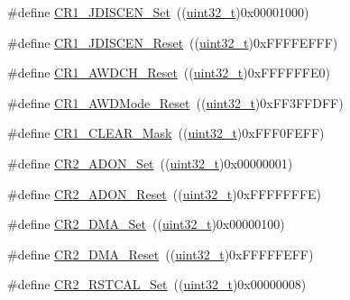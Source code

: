 \begin{DoxyCompactItemize}
\item 
\#define \hyperlink{group___a_d_c___private___defines_gafef4d16c890bf5e6eb381ad01c829309}{C\+R1\+\_\+\+J\+D\+I\+S\+C\+E\+N\+\_\+\+Set}~((\hyperlink{_p_e___types_8h_a33594304e786b158f3fb30289278f5af}{uint32\+\_\+t})0x00001000)
\item 
\#define \hyperlink{group___a_d_c___private___defines_gab6ffba92495342bd5f0a8b1fa216526b}{C\+R1\+\_\+\+J\+D\+I\+S\+C\+E\+N\+\_\+\+Reset}~((\hyperlink{_p_e___types_8h_a33594304e786b158f3fb30289278f5af}{uint32\+\_\+t})0x\+F\+F\+F\+F\+E\+F\+F\+F)
\item 
\#define \hyperlink{group___a_d_c___private___defines_gabe7e68383d281e58707a1cd749a3374e}{C\+R1\+\_\+\+A\+W\+D\+C\+H\+\_\+\+Reset}~((\hyperlink{_p_e___types_8h_a33594304e786b158f3fb30289278f5af}{uint32\+\_\+t})0x\+F\+F\+F\+F\+F\+F\+E0)
\item 
\#define \hyperlink{group___a_d_c___private___defines_gae53703f0c718ecc5b3e1a69c60af3697}{C\+R1\+\_\+\+A\+W\+D\+Mode\+\_\+\+Reset}~((\hyperlink{_p_e___types_8h_a33594304e786b158f3fb30289278f5af}{uint32\+\_\+t})0x\+F\+F3\+F\+F\+D\+F\+F)
\item 
\#define \hyperlink{group___a_d_c___private___defines_ga67f7dd35ea3d1296677e5fc50b88fa90}{C\+R1\+\_\+\+C\+L\+E\+A\+R\+\_\+\+Mask}~((\hyperlink{_p_e___types_8h_a33594304e786b158f3fb30289278f5af}{uint32\+\_\+t})0x\+F\+F\+F0\+F\+E\+F\+F)
\item 
\#define \hyperlink{group___a_d_c___private___defines_ga21779759f3d5d1389b114d7a1bb6fca1}{C\+R2\+\_\+\+A\+D\+O\+N\+\_\+\+Set}~((\hyperlink{_p_e___types_8h_a33594304e786b158f3fb30289278f5af}{uint32\+\_\+t})0x00000001)
\item 
\#define \hyperlink{group___a_d_c___private___defines_gaa3eb5d77998387159508a57d7e09f459}{C\+R2\+\_\+\+A\+D\+O\+N\+\_\+\+Reset}~((\hyperlink{_p_e___types_8h_a33594304e786b158f3fb30289278f5af}{uint32\+\_\+t})0x\+F\+F\+F\+F\+F\+F\+F\+E)
\item 
\#define \hyperlink{group___a_d_c___private___defines_ga7fa8ba27f5b249dd7cb0b6e53a25d6e2}{C\+R2\+\_\+\+D\+M\+A\+\_\+\+Set}~((\hyperlink{_p_e___types_8h_a33594304e786b158f3fb30289278f5af}{uint32\+\_\+t})0x00000100)
\item 
\#define \hyperlink{group___a_d_c___private___defines_ga8e674886185af86bc17d9266ddbdca7c}{C\+R2\+\_\+\+D\+M\+A\+\_\+\+Reset}~((\hyperlink{_p_e___types_8h_a33594304e786b158f3fb30289278f5af}{uint32\+\_\+t})0x\+F\+F\+F\+F\+F\+E\+F\+F)
\item 
\#define \hyperlink{group___a_d_c___private___defines_gaf256d4606fbe82d7e4cdc8d177653b53}{C\+R2\+\_\+\+R\+S\+T\+C\+A\+L\+\_\+\+Set}~((\hyperlink{_p_e___types_8h_a33594304e786b158f3fb30289278f5af}{uint32\+\_\+t})0x00000008)

\end{DoxyCompactItemize}
